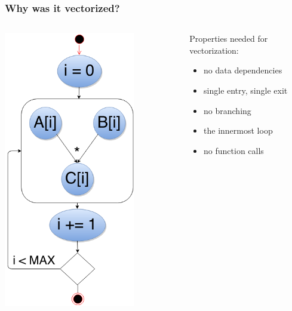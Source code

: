 \documentclass{beamer}
\begin{document}
\begin{frame}[fragile]
  \frametitle{Why was it vectorized?}
   \begin{columns}[onlytextwidth]
    \begin{column}{0.4\textwidth}
     \includegraphics[width=0.75\textwidth]{countable}
    \end{column}
    
    \begin{column}{0.6\textwidth}
      Properties needed for vectorization:
      \begin{itemize}
      \item no data dependencies
      \item single entry, single exit
      \item no branching
      \item the innermost loop
      \item no function calls      
      \end{itemize}
    \end{column}
  \end{columns}  
  
\end{frame}
\end{document}
